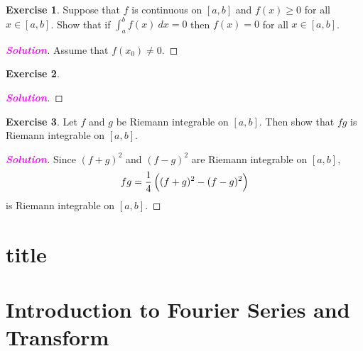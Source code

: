 \documentclass[12pt,openany]{book}
\theoremstyle{definition}
\newtheorem{exercise}{Exercise}[chapter]
\newcommand{\sol}{\textcolor{magenta}{\bf Solution}}
\begin{document}
	\vspace{15pt}
	\begin{tcolorbox}[colframe=execolor, title={\color{white}\bf}]
		\begin{exercise}
			Suppose that $f$ is continuous on $[a,b]$ and $f(x)\geq 0$ for all $x\in[a,b]$. Show that if $\int_a^bf(x)\ dx = 0$ then $f(x)=0$ for all $x\in[a,b]$.
		\end{exercise}
	\end{tcolorbox}
	\begin{proof}[\sol]
		Assume that $f(x_0)\neq 0$.
	\end{proof}
	\vspace{15pt}
	\begin{tcolorbox}[colframe=execolor, title={\color{white}\bf}]
		\begin{exercise}
			
		\end{exercise}
	\end{tcolorbox}
	\begin{proof}[\sol]
		
	\end{proof}
	\vspace{15pt}
	\begin{tcolorbox}[colframe=execolor, title={\color{white}\bf}]
		\begin{exercise}
			Let $f$ and $g$ be Riemann integrable on $[a,b]$. Then show that $fg$ is Riemann integrable on $[a,b]$.
		\end{exercise}
	\end{tcolorbox}
	\begin{proof}[\sol]
		Since $(f+g)^2$ and $(f-g)^2$ are Riemann integrable on $[a,b]$, \[
		fg=\frac{1}{4}\del{(f+g)^2-(f-g)^2}
		\] is Riemann integrable on $[a,b]$.
	\end{proof}

	\newpage
	\chapter{title}
	
	\newpage
	\chapter{Introduction to Fourier Series and Transform}
\end{document}
